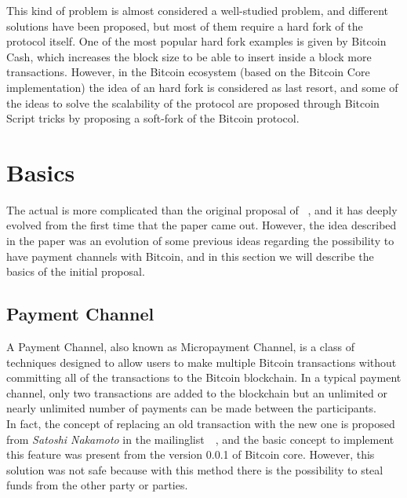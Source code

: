 This kind of problem is almost considered a well-studied problem, and different solutions have been proposed, but most of them require a hard fork  of the protocol itself.
One of the most popular hard fork examples is given by Bitcoin Cash, which 
increases the block size to be able to insert inside a block more transactions.
However, in the Bitcoin ecosystem (based on the Bitcoin Core implementation) the idea of an hard fork is considered 
as last resort, and some of the ideas to solve the scalability of the protocol are proposed through 
Bitcoin Script tricks by proposing a soft-fork of the Bitcoin protocol.

\section{{\LN} Basics}

The actual {\LN} is more complicated than the original proposal of  ~\cite{lightning-network-paper}, and it has deeply
evolved from the first time that the paper came out. However, the idea described in the paper was an evolution
of some previous ideas regarding the possibility to have payment channels with Bitcoin, and in this section we will describe the basics of the initial proposal.

\subsection{Payment Channel}

A Payment Channel, also known as Micropayment Channel, is a class of techniques designed to allow users to make multiple
Bitcoin transactions without committing all of the transactions to the Bitcoin blockchain. In a typical payment channel,
only two transactions are added to the blockchain but an unlimited or nearly unlimited number of payments
can be made between the participants.\\
In fact, the concept of replacing an old transaction with the new one is proposed from \emph{Satoshi Nakamoto}
in the mailinglist~~\cite{payment-channels-satoshi}, and
the basic concept to implement this feature was present from the version 0.0.1 of Bitcoin core. However, this solution
was not safe because with this method there is the possibility to steal funds from the other party or parties.\\

